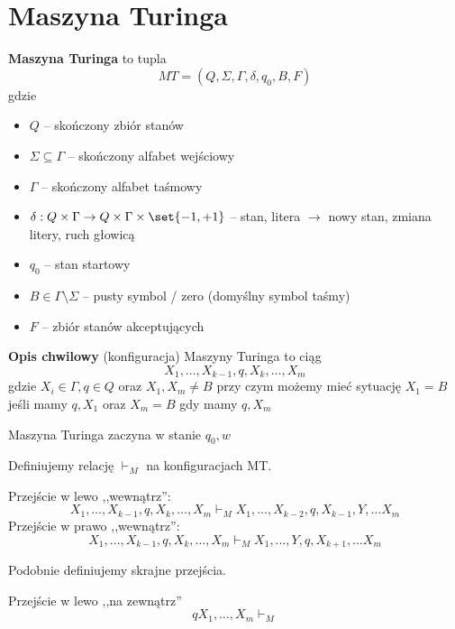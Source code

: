 \section{Maszyna Turinga}
\begin{definition}
	\textbf{Maszyna Turinga} to tupla
	\[
		MT = (Q, \Sigma, \Gamma, \delta, q_0, B, F)
	\]
	gdzie
	\begin{itemize}
		\item \( Q \) -- skończony zbiór stanów
		\item \( \Sigma \subseteq \Gamma \) -- skończony alfabet wejściowy
		\item \( \Gamma \) -- skończony alfabet taśmowy
		\item \( \delta : Q \times \Gamma \rightarrow
		      Q \times \Gamma \times \set{-1, +1}
		      \) -- stan, litera \( \rightarrow \) nowy stan, zmiana litery, ruch głowicą
		\item \( q_0 \) -- stan startowy
		\item \( B \in \Gamma \setminus \Sigma \) -- pusty symbol / zero (domyślny symbol taśmy)
		\item \( F \) -- zbiór stanów akceptujących
	\end{itemize}
\end{definition}

\begin{definition}
	\textbf{Opis chwilowy} (konfiguracja) Maszyny Turinga to
	ciąg
	\[
		X_1, \dots, X_{k-1}, q, X_k, \dots, X_m
	\]
	gdzie \( X_i \in \Gamma, q \in Q\) oraz \( X_1, X_m \neq B \) przy czym możemy mieć sytuację \( X_1 = B \) jeśli mamy \( q, X_1 \) oraz \( X_m = B \) gdy mamy \( q, X_m \)

	Maszyna Turinga zaczyna w stanie \( q_0, w \)
\end{definition}

\begin{definition}
	Definiujemy relację \( \vdash_M \) na konfiguracjach MT.

	Przejście w lewo ,,wewnątrz'':
	\[
		X_1, \dots, X_{k-1}, q, X_k, \dots, X_m
		\vdash_M
		X_1, \dots, X_{k-2}, q, X_{k-1}, Y, \dots X_m
	\]
	Przejście w prawo ,,wewnątrz'':
	\[
		X_1, \dots, X_{k-1}, q, X_k, \dots, X_m
		\vdash_M
		X_1, \dots, Y, q, X_{k+1}, \dots X_m
	\]

	Podobnie definiujemy skrajne przejścia.

	Przejście w lewo ,,na zewnątrz''
	\[
		q X_1, \dots, X_m \vdash_M
	\]


\end{definition}


